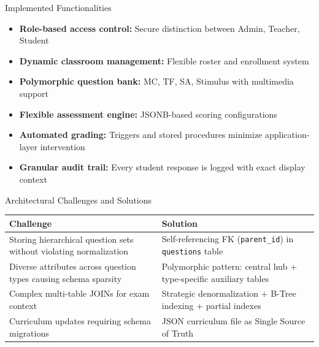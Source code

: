 \documentclass[aspectratio=169, 10pt]{beamer}
\begin{document}
\begin{frame}{Implemented Functionalities}
    \begin{itemize}
        \item \textbf{Role-based access control:} Secure distinction between Admin, Teacher, Student
        \item \textbf{Dynamic classroom management:} Flexible roster and enrollment system
        \item \textbf{Polymorphic question bank:} MC, TF, SA, Stimulus with multimedia support
        \item \textbf{Flexible assessment engine:} JSONB-based scoring configurations
        \item \textbf{Automated grading:} Triggers and stored procedures minimize application-layer intervention
        \item \textbf{Granular audit trail:} Every student response is logged with exact display context
    \end{itemize}
\end{frame}


\begin{frame}{Architectural Challenges and Solutions}
    \centering
    \small
    \begin{tabular}{|p{5.5cm}|p{6.5cm}|}
        \hline
        \textbf{Challenge} & \textbf{Solution} \\ \hline
        Storing hierarchical question sets without violating normalization & Self-referencing FK (\texttt{parent\_id}) in \texttt{questions} table \\ \hline
        Diverse attributes across question types causing schema sparsity & Polymorphic pattern: central hub + type-specific auxiliary tables \\ \hline
        Complex multi-table JOINs for exam context & Strategic denormalization + B-Tree indexing + partial indexes \\ \hline
        Curriculum updates requiring schema migrations & JSON curriculum file as Single Source of Truth \\ \hline
    \end{tabular}
\end{frame}
\end{document}
